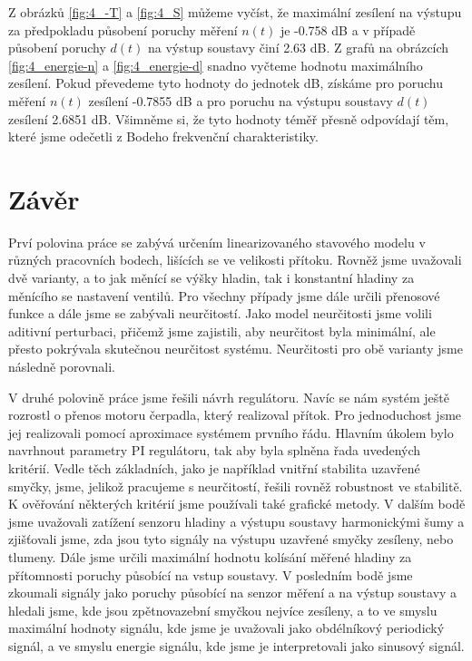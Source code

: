 \documentclass[a4paper,11pt]{article}
\begin{document}
Z obrázků \ref{fig:4_-T} a \ref{fig:4_S} můžeme vyčíst, že maximální zesílení na výstupu za předpokladu působení poruchy měření $ n\left ( t \right ) $ je -0.758 dB a v případě působení poruchy $ d\left ( t \right ) $ na výstup soustavy činí 2.63 dB. Z grafů na obrázcích \ref{fig:4_energie-n} a \ref{fig:4_energie-d} snadno vyčteme hodnotu maximálního zesílení. Pokud převedeme tyto hodnoty do jednotek dB, získáme pro poruchu měření $ n\left ( t \right ) $ zesílení -0.7855 dB a pro poruchu na výstupu soustavy $ d\left ( t \right ) $ zesílení  2.6851 dB. Všimněme si, že tyto hodnoty téměř přesně odpovídají těm, které jsme odečetli z Bodeho frekvenční charakteristiky.



\newpage 
\section{Závěr}
Prví polovina práce se zabývá určením linearizovaného stavového modelu v různých pracovních bodech, lišících se ve velikosti přítoku. Rovněž jsme uvažovali dvě varianty, a to jak měnící se výšky hladin, tak i konstantní hladiny za měnícího se nastavení ventilů. Pro všechny případy jsme dále určili přenosové funkce a dále jsme se zabývali neurčitostí. Jako model neurčitosti jsme volili aditivní perturbaci, přičemž jsme zajistili, aby neurčitost byla minimální, ale přesto pokrývala skutečnou neurčitost systému. Neurčitosti pro obě varianty jsme následně porovnali.

V druhé polovině práce jsme řešili návrh regulátoru. Navíc se nám systém ještě rozrostl o přenos motoru čerpadla, který realizoval přítok. Pro jednoduchost jsme jej realizovali pomocí aproximace systémem prvního řádu. Hlavním úkolem bylo navrhnout parametry PI regulátoru, tak aby byla splněna řada uvedených kritérií. Vedle těch základních, jako je například vnitřní stabilita uzavřené smyčky, jsme, jelikož pracujeme s neurčitostí, řešili rovněž robustnost ve stabilitě. K ověřování některých kritérií jsme používali také grafické metody. V dalším bodě jsme uvažovali zatížení senzoru hladiny a výstupu soustavy harmonickými šumy a zjišťovali jsme, zda jsou tyto signály na výstupu uzavřené smyčky zesíleny, nebo tlumeny. Dále jsme určili maximální hodnotu kolísání měřené hladiny za přítomnosti poruchy působící na vstup soustavy. V posledním bodě jsme zkoumali signály jako poruchy působící na senzor měření a na výstup soustavy a hledali jsme, kde jsou zpětnovazební smyčkou nejvíce zesíleny, a to ve smyslu maximální hodnoty signálu, kde jsme je uvažovali jako obdélníkový periodický signál, a ve smyslu energie signálu, kde jsme je interpretovali jako sinusový signál.
\end{document}
